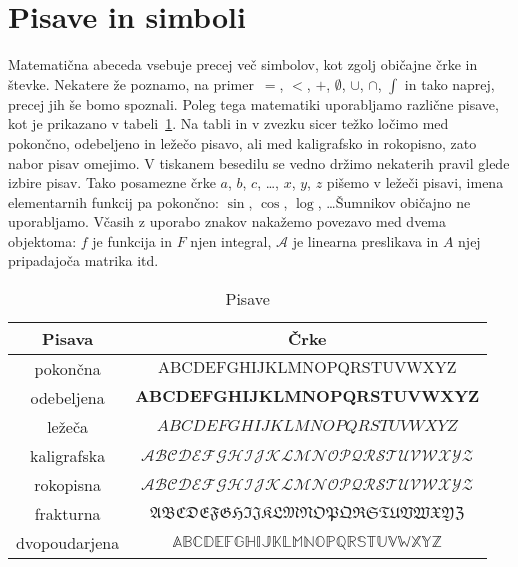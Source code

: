 


\section{Pisave in simboli}
\label{sec:pisave-in-simboli}

Matematična abeceda vsebuje precej več simbolov, kot zgolj običajne črke in števke. Nekatere že poznamo, na primer~$=$, $<$, $+$, $\emptyset$, $\cup$, $\cap$, $\int$ in tako naprej, precej jih še bomo spoznali. Poleg tega matematiki uporabljamo različne pisave, kot je prikazano v tabeli~\ref{tabela:oblike-crk}. Na tabli in v zvezku sicer težko ločimo med pokončno, odebeljeno in ležečo pisavo, ali med kaligrafsko in rokopisno, zato nabor pisav omejimo. V tiskanem besedilu se vedno držimo nekaterih pravil glede izbire pisav. Tako posamezne črke $a$, $b$, $c$, \dots, $x$, $y$, $z$ pišemo v ležeči pisavi, imena elementarnih funkcij pa pokončno: $\sin$, $\cos$, $\log$, \ldots Šumnikov običajno ne uporabljamo. Včasih z uporabo znakov nakažemo povezavo med dvema objektoma: $f$ je funkcija in $F$ njen integral, $\mathcal{A}$ je linearna preslikava in $A$ njej pripadajoča matrika itd.

\begin{table}[ht]
\centering
\begin{tabular}{c|c}
\textbf{Pisava} & \textbf{Črke} \\
\hline
pokončna & $\mathrm{ABCDEFGHIJKLMNOPQRSTUVWXYZ}$ \\
odebeljena & $\mathbf{ABCDEFGHIJKLMNOPQRSTUVWXYZ}$ \\
ležeča & $ABCDEFGHIJKLMNOPQRSTUVWXYZ$ \\
kaligrafska & $\mathcal{ABCDEFGHIJKLMNOPQRSTUVWXYZ}$ \\
rokopisna & $\mathscr{ABCDEFGHIJKLMNOPQRSTUVWXYZ}$ \\
frakturna & $\mathfrak{ABCDEFGHIJKLMNOPQRSTUVWXYZ}$ \\
dvopoudarjena & $\mathbb{ABCDEFGHIJKLMNOPQRSTUVWXYZ}$
\end{tabular}
\caption{Pisave}\label{tabela:oblike-crk}
\end{table}

